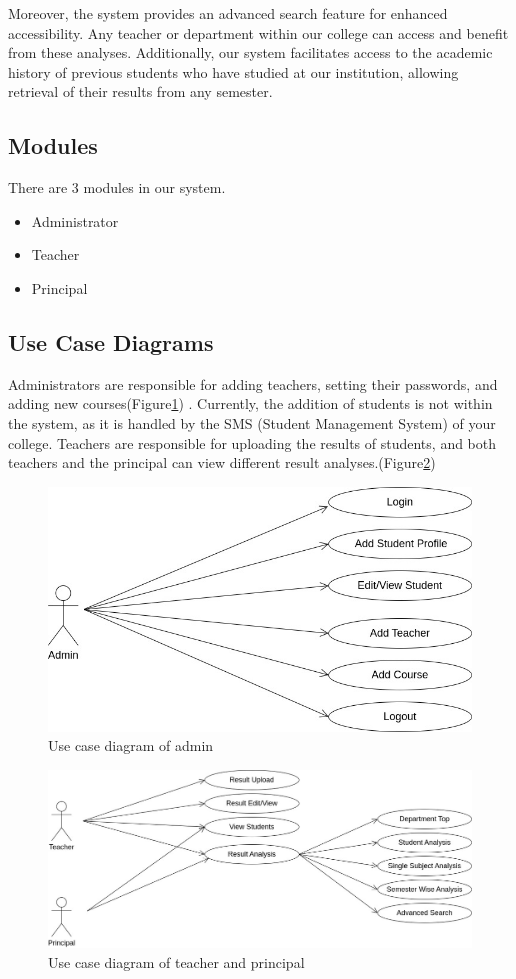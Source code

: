 \documentclass{nascproject}
\begin{document}
Moreover, the system provides an advanced search feature for enhanced accessibility. Any teacher or department within our college can access and benefit from these analyses. Additionally, our system facilitates access to the academic history of previous students who have studied at our institution, allowing retrieval of their results from any semester.
\subsection{Modules}
	There are 3 modules in our system.
  \begin{itemize}
  	\item Administrator
  	\item Teacher
  	\item Principal
  \end{itemize}


\subsection{Use Case Diagrams}
	Administrators are responsible for adding teachers, setting their passwords, and adding new courses(Figure\ref{usecase1}) . Currently, the addition of students is not within the system, as it is handled by the SMS (Student Management System) of your college. Teachers are responsible for uploading the results of students, and both teachers and the principal can view different result analyses.(Figure\ref{usecase2})
\begin{figure}
	\centering
	\includegraphics[width=1\linewidth]{usecase.jpg}
	\caption{Use case diagram of admin}
	\label{usecase1}
\end{figure}
\begin{figure}
	\centering
	\includegraphics[width=1\linewidth]{usecase1.jpg}
	\caption{Use case diagram of teacher and principal}
	\label{usecase2}
\end{figure}
\end{document}
